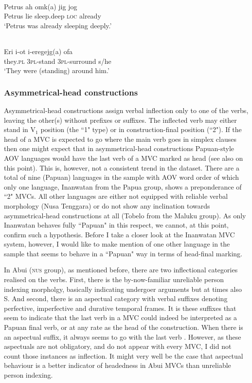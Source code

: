 \ea 
{}\\
\gll Petrus ah omk(a) jig jog \\
Petrus lie sleep.deep \textsc{loc} already \\
\glft `Petrus was already sleeping deeply.’ \\ 
\z

\ea 
{}\\
\gll Eri i-ot i-eregejg(a) ofa \\
they.\textsc{pl} 3\textsc{pl}-stand 3\textsc{pl}-surround s/he \\
\glft `They were (standing) around him.’\\ 
\z

\subsubsection{Asymmetrical-head constructions} \label{sec:asymmetrical}

Asymmetrical-head constructions assign verbal inflection only to one of the verbs, leaving the other(s) without prefixes or suffixes. The inflected verb may either stand in V$_1$ position (the ``1" type) or in construction-final position (``2"). If the head of a MVC is expected to go where the main verb goes in simplex clauses then one might expect that in asymmetrical-head constructions Papuan-style AOV languages would have the last verb of a MVC marked as head (see also \citealt{Durie1997} on this point). This is, however, not a consistent trend in the dataset. There are a total of nine (Papuan) languages in the sample with AOV word order of which only one language, Inanwatan from the Papua group, shows a preponderance of ``2" MVCs. All other languages are either not equipped with reliable verbal morphology (Nusa Tenggara) or do not show any inclination towards asymmetrical-head constructions at all (Tobelo from the Maluku group). As only Inanwatan behaves fully ``Papuan" in this respect, we cannot, at this point, confirm such a hypothesis. Before I take a closer look at the Inanwatan MVC system, however, I would like to make mention of one other language in the sample that seems to behave in a ``Papuan" way in terms of head-final marking.

In Abui (\textsc{nus} group), as mentioned before, there are two inflectional categories realised on the verbs. First, there is the by-now-familiar unreliable person indexing morpholgy, basically indicating undergoer arguments but at times also S. And second, there is an aspectual category with verbal suffixes denoting perfective, imperfective and durative temporal frames. It is these suffixes that seem to indicate that the last verb in a MVC could indeed be interpreted as a Papuan final verb, or at any rate as the head of the construction. When there is an aspectual suffix, it always seems to go with the last verb \citep[350]{kratochvil2007grammar}. However, as these aspectuals are not obligatory, and do not appear with every MVC, I did not count those instances as inflection. It might very well be the case that aspectual behaviour is a better indicator of headedness in Abui MVCs than unreliable person indexing.  

